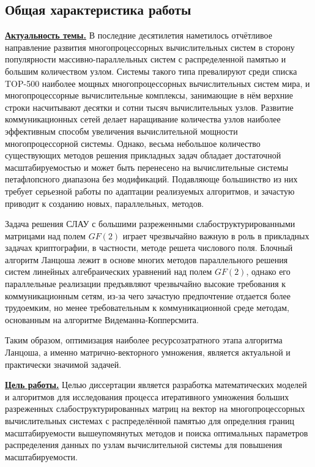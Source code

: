 \subsection*{\Large Общая характеристика работы}
\fontsize{14pt}{15pt}\selectfont
\underline{\textbf{Актуальность темы.}}
В  последние десятилетия наметилось отчётливое направление развития многопроцессорных вычислительных систем в сторону
популярности массивно-параллельных систем с распределенной памятью и большим количеством узлом. Системы такого типа
превалируют среди списка TOP-500 наиболее мощных многопроцессорных вычислительных систем мира, и многопроцессорные
вычислительные комплексы, занимающие в нём верхние строки насчитывают десятки и сотни тысяч вычислительных узлов.
Развитие коммуникационных сетей делает наращивание количества узлов наиболее эффективным способм увеличения
вычислительной мощности  многопроцессорной системы. Однако, весьма небольшое количество существующих методов решения прикладных задач
обладает достаточной масштабируемостью и может быть перенесено на вычислительные системы петафлопсного диапазона без
 модификаций. Подавляюще большинство из них требует серьезной работы по адаптации реализуемых алгоритмов, и зачастую
 приводит к созданию новых, параллельных, методов.

 Задача решения СЛАУ с большими разреженными слабоструктурированными матрицами над полем $GF(2)$ играет чрезвычайно
 важную в роль в прикладных задачах криптографии, в частности, методе решета числового поля. Блочный алгоритм Ланцоша
 лежит в основе многих методов параллельного решения систем линейных алгебраических уравнений над полем $GF(2)$, однако
 его параллельные реализации  предъявляют чрезвычайно  высокие требования к коммуникационным сетям, из-за чего зачастую
 предпочтение отдается более трудоемким, но менее требовательным к коммуникационной среде методам, основанным на
 алгоритме Видеманна-Копперсмита. 

 Таким образом, оптимизация наиболее ресурсозатратного этапа алгоритма Ланцоша, а именно матрично-векторного умножения,
 является актуальной и практически значимой задачей.

\underline{\textbf{Цель работы.}} Целью диссертации является разработка математических моделей и алгоритмов для
исследования процесса итеративного умножения больших разреженных слабоструктурированных матриц на вектор на
многопроцессорных вычислительных системах с распределённой памятью для определния границ масштабируемости вышеупомянутых
методов и поиска оптимальных параметров распределения данных по узлам вычислительной системы для повышения
масштабируемости.

